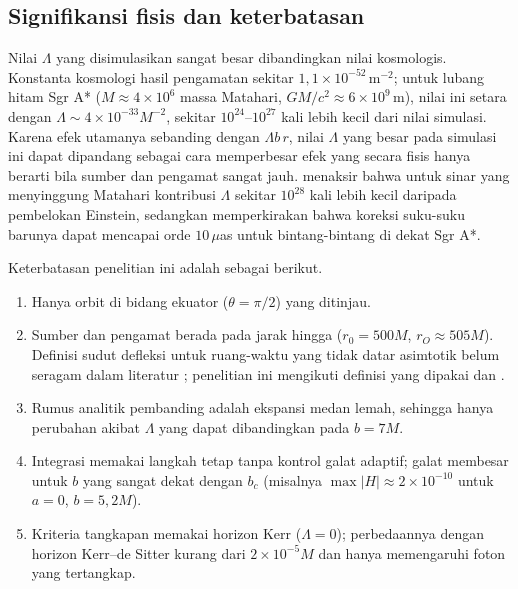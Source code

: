 \documentclass[11pt,a4paper]{article}
\begin{document}
\FloatBarrier
\subsection{Signifikansi fisis dan keterbatasan}

Nilai $\Lambda$ yang disimulasikan sangat besar dibandingkan nilai kosmologis. Konstanta kosmologi hasil
pengamatan sekitar $1{,}1\times10^{-52}\,\text{m}^{-2}$; untuk lubang hitam Sgr A* ($M \approx 4\times10^6$
massa Matahari, $GM/c^2 \approx 6\times10^9$\,m), nilai ini setara dengan $\Lambda \sim 4\times10^{-33}M^{-2}$,
sekitar $10^{24}$--$10^{27}$ kali lebih kecil dari nilai simulasi. Karena efek utamanya sebanding dengan
$\Lambda b\,r$, nilai $\Lambda$ yang besar pada simulasi ini dapat dipandang sebagai cara memperbesar efek
yang secara fisis hanya berarti bila sumber dan pengamat sangat jauh. \citet{rindler2007contribution}
menaksir bahwa untuk sinar yang menyinggung Matahari kontribusi $\Lambda$ sekitar $10^{28}$ kali lebih kecil
daripada pembelokan Einstein, sedangkan \citet{huang2025influence} memperkirakan bahwa koreksi suku-suku
barunya dapat mencapai orde $10\,\mu$as untuk bintang-bintang di dekat Sgr A*.

Keterbatasan penelitian ini adalah sebagai berikut.
\begin{enumerate}
  \item Hanya orbit di bidang ekuator ($\theta = \pi/2$) yang ditinjau.
  \item Sumber dan pengamat berada pada jarak hingga ($r_0 = 500M$, $r_O \approx 505M$). Definisi
        sudut defleksi untuk ruang-waktu yang tidak datar asimtotik belum seragam dalam literatur
        \citep{arakida2018light,hu2022light}; penelitian ini mengikuti definisi
        \citet{ishihara2016gravitational} yang dipakai \citet{belhaj2022light} dan \citet{huang2025influence}.
  \item Rumus analitik pembanding adalah ekspansi medan lemah, sehingga hanya perubahan akibat $\Lambda$ yang
        dapat dibandingkan pada $b = 7M$.
  \item Integrasi memakai langkah tetap tanpa kontrol galat adaptif; galat membesar untuk $b$ yang sangat
        dekat dengan $b_c$ (misalnya $\max|H| \approx 2\times10^{-10}$ untuk $a = 0$, $b = 5{,}2M$).
  \item Kriteria tangkapan memakai horizon Kerr ($\Lambda = 0$); perbedaannya dengan horizon
        Kerr--de Sitter kurang dari $2\times10^{-5}M$ dan hanya memengaruhi foton yang tertangkap.
\end{enumerate}
\end{document}
